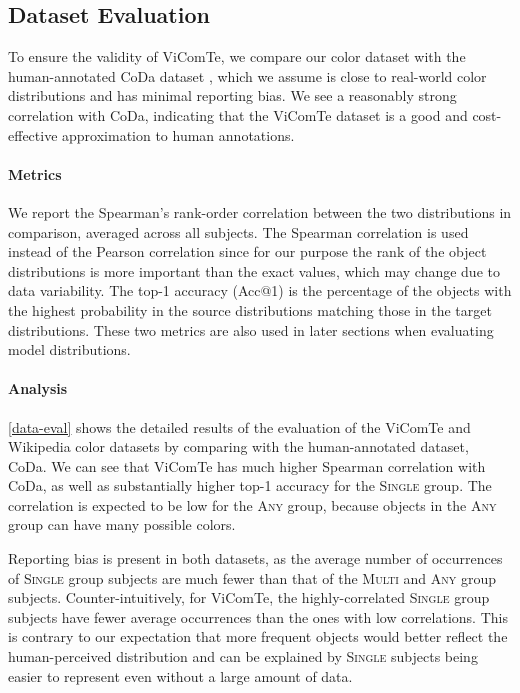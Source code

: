 \documentclass[11pt]{article}
\newcommand{\Single}{{\scshape Single}}
\newcommand{\Multi}{{\scshape Multi}}
\newcommand{\Any}{{\scshape Any}}
\newcommand{\dataset}{ViComTe}
\begin{document}
\subsection{Dataset Evaluation} \label{sec:data_eval} 

To ensure the validity of {\dataset}, we compare our color dataset with the human-annotated CoDa dataset \citep{paik-etal-2021-world}, which we assume is close to real-world color distributions and has minimal reporting bias.
We see a reasonably strong correlation with CoDa, indicating that the {\dataset} dataset is a good and cost-effective approximation to human annotations.

\paragraph{Metrics}
We report the Spearman's rank-order correlation between the two distributions in comparison, averaged across all subjects. The Spearman correlation is used instead of the Pearson correlation since for our purpose the rank of the object distributions is more important than the exact values, which may change due to data variability.
The top-1 accuracy (Acc@1) is the percentage of the objects with the highest probability in the source distributions matching those in the target distributions.
These two metrics are also used in later sections when evaluating model distributions.

\paragraph{Analysis}

\cref{data-eval} shows the detailed results of the evaluation of the {\dataset} and Wikipedia color datasets by comparing with the human-annotated dataset, CoDa. We can see that {\dataset} has much higher Spearman correlation with CoDa, as well as substantially higher top-1 accuracy for the \Single{} group. The correlation is expected to be low for the \Any{} group, because objects in the \Any{} group can have many possible colors.

Reporting bias is present in both datasets, as the average number of occurrences of \Single{} group subjects are much fewer than that of the \Multi{} and \Any{} group subjects. 
Counter-intuitively, for {\dataset}, the highly-correlated \Single{} group subjects have fewer average occurrences than the ones with low correlations. 
This is contrary to our expectation that more frequent objects would better reflect the human-perceived distribution
and can be explained by \Single{} subjects being easier to represent even without a large amount of data.
\end{document}
